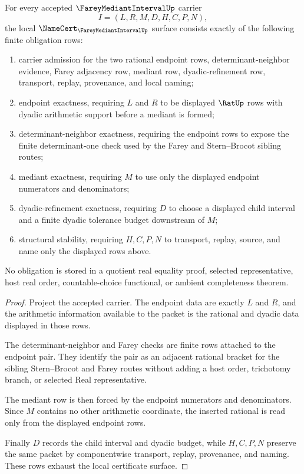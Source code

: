 \begin{theorem}
\label{thm:farey-mediant-interval-namecert-obligations}
For every accepted $\FareyMediantIntervalUp$ carrier
$$
I=(L,R,M,D,H,C,P,N),
$$
the local $\NameCert_{\FareyMediantIntervalUp}$ surface consists exactly of the following finite obligation rows:
\begin{enumerate}
\item carrier admission for the two rational endpoint rows, determinant-neighbor evidence, Farey adjacency row, mediant row, dyadic-refinement row, transport, replay, provenance, and local naming;
\item endpoint exactness, requiring $L$ and $R$ to be displayed $\RatUp$ rows with dyadic arithmetic support before a mediant is formed;
\item determinant-neighbor exactness, requiring the endpoint rows to expose the finite determinant-one check used by the Farey and Stern--Brocot sibling routes;
\item mediant exactness, requiring $M$ to use only the displayed endpoint numerators and denominators;
\item dyadic-refinement exactness, requiring $D$ to choose a displayed child interval and a finite dyadic tolerance budget downstream of $M$;
\item structural stability, requiring $H,C,P,N$ to transport, replay, source, and name only the displayed rows above.
\end{enumerate}
No obligation is stored in a quotient real equality proof, selected representative, host real order, countable-choice functional, or ambient completeness theorem.
\end{theorem}
\begin{proof}
Project the accepted carrier. The endpoint data are exactly $L$ and $R$, and the arithmetic information available to the packet is the rational and dyadic data displayed in those rows.

The determinant-neighbor and Farey checks are finite rows attached to the endpoint pair. They identify the pair as an adjacent rational bracket for the sibling Stern--Brocot and Farey routes without adding a host order, trichotomy branch, or selected Real representative.

The mediant row is then forced by the endpoint numerators and denominators. Since $M$ contains no other arithmetic coordinate, the inserted rational is read only from the displayed endpoint rows.

Finally $D$ records the child interval and dyadic budget, while $H,C,P,N$ preserve the same packet by componentwise transport, replay, provenance, and naming. These rows exhaust the local certificate surface.
\end{proof}

